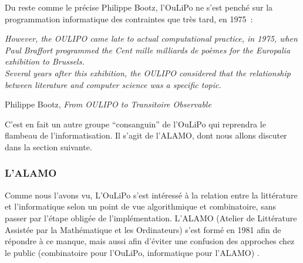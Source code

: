 \documentclass{article}
\newenvironment{citationbox}
{\begin{center}
		\begin{minipage}{.8\textwidth}
		}
		{
		\end{minipage}	
\end{center}
}
\begin{document}
					Du reste comme le précise Philippe Bootz, l'OuLiPo ne s'est penché sur la programmation informatique des contraintes que très tard, en 1975~:
					\begin{citationbox}
						\textit{However, the OULIPO came late to actual computational practice, in 1975, when Paul Braffort programmed the Cent mille milliards de poèmes for the Europalia exhibition to Brussels.\\
						Several years after this exhibition, the OULIPO considered that the relationship between literature and computer science was a specific topic.}
						\begin{flushright}
							Philippe Bootz, \textit{From OULIPO to Transitoire Observable} \cite{bootz2012}
						\end{flushright}
					\end{citationbox}
					C'est en fait un autre groupe ``consanguin'' de l'OuLiPo qui reprendra le flambeau de l'informatisation. Il s'agit de l'ALAMO, dont nous allons discuter dans la section suivante.
				
				
				
			\subsubsection{L'ALAMO}
				Comme nous l'avons vu, L'OuLiPo s'est intéressé à la relation entre la littérature et l'informatique selon un point de vue algorithmique et combinatoire, sans passer par l'étape obligée de l'implémentation. L'ALAMO (Atelier de Littérature Assistée par la Mathématique et les Ordinateurs) s'est formé en 1981 afin de répondre à ce manque, mais aussi afin d'éviter une confusion des approches chez le public (combinatoire pour l'OuLiPo, informatique pour l'ALAMO) \cite{alamo}.\\
				
\end{document}
